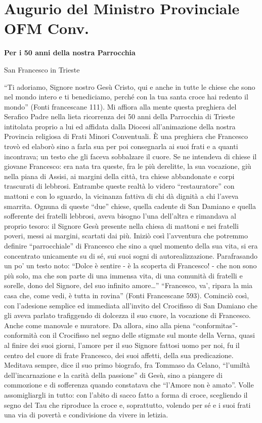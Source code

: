 \chapter*{Augurio del Ministro Provinciale OFM Conv.}
\begin{center}
\bfseries
	Per i 50 anni della nostra Parrocchia\par San Francesco in Trieste
\end{center}
``Ti adoriamo, Signore nostro Gesù Cristo, qui e anche in tutte le chiese che sono nel mondo 
intero e ti benediciamo, perché con la tua santa croce hai redento il mondo” (Fonti francescane 
111). Mi affiora alla mente questa preghiera del Serafico Padre nella lieta ricorrenza dei 50 anni 
della Parrocchia di Trieste intitolata proprio a lui ed affidata dalla Diocesi all’animazione della 
nostra Provincia religiosa di Frati Minori Conventuali. È una preghiera che Francesco trovò ed 
elaborò sino a farla sua per poi consegnarla ai suoi frati e a quanti incontrava; un testo che gli 
faceva sobbalzare il cuore. Se ne intendeva di chiese il giovane Francesco: era nata tra queste, fra le 
più derelitte, la sua vocazione, giù nella piana di Assisi, ai margini della città, tra chiese 
abbandonate e corpi trascurati di lebbrosi. Entrambe queste realtà lo videro “restauratore” con 
mattoni e con lo sguardo, la vicinanza fattiva di chi dà dignità a chi l’aveva smarrita. Ognuna di 
queste “due” chiese, quella cadente di San Damiano e quella sofferente dei fratelli lebbrosi, aveva 
bisogno l’una dell’altra e rimandava al proprio tesoro: il Signore Gesù presente nella chiesa di 
mattoni e nei fratelli poveri, messi ai margini, scartati dai più. Iniziò così l’avventura che potremmo 
definire ``parrocchiale'' di Francesco che sino a quel momento della sua vita, si era concentrato 
unicamente su di sé, sui suoi sogni di autorealizzazione. Parafrasando un po' un testo noto: ``Dolce è 
sentire - è la scoperta di Francesco! - che non sono più solo, ma che son parte di una immensa vita, 
di una comunità di fratelli e sorelle, dono del Signore, del suo infinito amore…''
\bigbreak
``Francesco, va’, ripara la mia casa che, come vedi, è tutta in rovina'' (Fonti Francescane 
593). Cominciò così, con l’adesione semplice ed immediata all’invito del Crocifisso di San 
Damiano che gli aveva parlato trafiggendo di dolcezza il suo cuore, la vocazione di Francesco. 
Anche come manovale e muratore. Da allora, sino alla piena “conformitas”- conformità con il 
Crocifisso nel segno delle stigmate sul monte della Verna, quasi al finire dei suoi giorni, l’amore 
per il suo Signore fattosi uomo per noi, fu il centro del cuore di frate Francesco, dei suoi affetti, 
della sua predicazione. Meditava sempre, dice il suo primo biografo, fra Tommaso da Celano, 
“l’umiltà dell’incarnazione e la carità della passione” di Gesù, sino a piangere di commozione e di 
sofferenza quando constatava che “l’Amore non è amato”. Volle assomigliargli in tutto: con l’abito 
di sacco fatto a forma di croce, scegliendo il segno del Tau che riproduce la croce e, soprattutto, 
volendo per sé e i suoi frati una via di povertà e condivisione da vivere in letizia.

